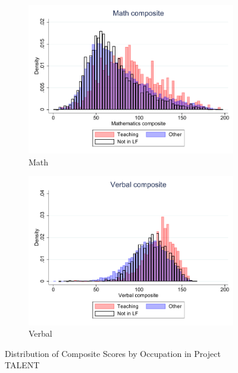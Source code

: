 \documentclass[onehalfspacing,11pt]{article}
\begin{document}
\begin{figure}
	\begin{subfigure}{0.49\textwidth}
		\includegraphics[width=\linewidth]{TALENT_math_occ.pdf}
		\caption{Math} \label{fig:talentmath}
	\end{subfigure}
	\hspace*{\fill} %
	\begin{subfigure}{0.49\textwidth}
		\includegraphics[width=\linewidth]{TALENT_verb_occ.pdf}
		\caption{Verbal} \label{fig:talentverb}
	\end{subfigure}
	\caption{Distribution of Composite Scores by Occupation in Project TALENT} \label{fig:talent}
\end{figure}
\end{document}
